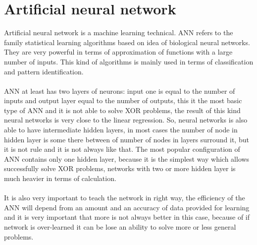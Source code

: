 \documentclass[english]{article}
\begin{document}
\section{Artificial neural network}
Artificial neural network is a machine learning technical. ANN refers to the family statistical learning algorithms based on idea of biological neural networks.  They are very powerful in terms of approximation of functions with a large number of inputs. This kind of algorithms is mainly used in terms of classification and pattern identification.\\\\
ANN at least has two layers of neurons: input one is equal to the number of inputs and output layer equal to the number of outputs, this it the most basic type of ANN and it is not able to solve XOR problems, the result of this kind neural networks is very close to the linear regression. So, neural networks is also able to have intermediate hidden layers, in most cases the number of node in hidden layer is some there between of number of nodes in layers surround it, but it is not rule and it is not always like that. The most popular configuration of ANN contains only one hidden layer, because it is the simplest way which allows successfully solve XOR problems, networks with two or more hidden layer is much heavier in terms of calculation.\\\\
It is also very important to teach the network in right way, the efficiency of the ANN will depend from an amount and an accuracy of data provided for learning and it is very important that more is not always better in this case, because of if network is over-learned it can be lose an ability to solve more or less general problems.
\end{document}
